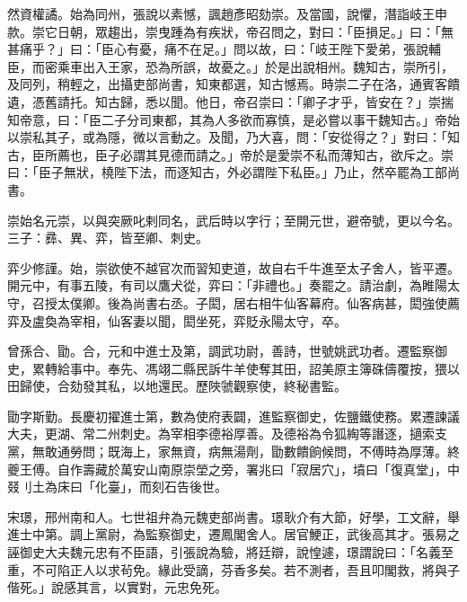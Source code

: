 \begin{pinyinscope}
 然資權譎。始為同州，張說以素憾，諷趙彥昭劾崇。及當國，說懼，潛詣岐王申款。崇它日朝，眾趨出，崇曳踵為有疾狀，帝召問之，對曰：「臣損足。」曰：「無甚痛乎？」曰：「臣心有憂，痛不在足。」問以故，曰：「岐王陛下愛弟，張說輔臣，而密乘車出入王家，恐為所誤，故憂之。」於是出說相州。魏知古，崇所引，及同列，稍輕之，出攝吏部尚書，知東都選，知古憾焉。時崇二子在洛，通賓客饋遺，憑舊請托。知古歸，悉以聞。他日，帝召崇曰：「卿子才乎，皆安在？」崇揣知帝意，曰：「臣二子分司東都，其為人多欲而寡慎，是必嘗以事干魏知古。」帝始以崇私其子，或為隱，微以言動之。及聞，乃大喜，問：「安從得之？」對曰：「知古，臣所薦也，臣子必謂其見德而請之。」帝於是愛崇不私而薄知古，欲斥之。崇曰：「臣子無狀，橈陛下法，而逐知古，外必謂陛下私臣。」乃止，然卒罷為工部尚書。



 崇始名元崇，以與突厥叱剌同名，武后時以字行；至開元世，避帝號，更以今名。三子：彞、異、弈，皆至卿、刺史。



 弈少修謹。始，崇欲使不越官次而習知吏道，故自右千牛進至太子舍人，皆平遷。開元中，有事五陵，有司以鷹犬從，弈曰：「非禮也。」奏罷之。請治劇，為睢陽太守，召授太僕卿。後為尚書右丞。子閎，居右相牛仙客幕府。仙客病甚，閎強使薦弈及盧奐為宰相，仙客妻以聞，閎坐死，弈貶永陽太守，卒。



 曾孫合、勖。合，元和中進士及第，調武功尉，善詩，世號姚武功者。遷監察御史，累轉給事中。奉先、馮翊二縣民訴牛羊使奪其田，詔美原主簿硃儔覆按，猥以田歸使，合劾發其私，以地還民。歷陜虢觀察使，終秘書監。



 勖字斯勤。長慶初擢進士第，數為使府表闢，進監察御史，佐鹽鐵使務。累遷諫議大夫，更湖、常二州刺史。為宰相李德裕厚善。及德裕為令狐綯等譖逐，擿索支黨，無敢通勞問；既海上，家無資，病無湯劑，勖數饋餉候問，不傅時為厚薄。終夔王傅。自作壽藏於萬安山南原崇塋之旁，署兆曰「寂居穴」，墳曰「復真堂」，中叕刂土為床曰「化臺」，而刻石告後世。



 宋璟，邢州南和人。七世祖弁為元魏吏部尚書。璟耿介有大節，好學，工文辭，舉進士中第。調上黨尉，為監察御史，遷鳳閣舍人。居官鯁正，武後高其才。張易之誣御史大夫魏元忠有不臣語，引張說為驗，將廷辯，說惶遽，璟謂說曰：「名義至重，不可陷正人以求茍免。緣此受謫，芬香多矣。若不測者，吾且叩閣救，將與子偕死。」說感其言，以實對，元忠免死。




\end{pinyinscope}
